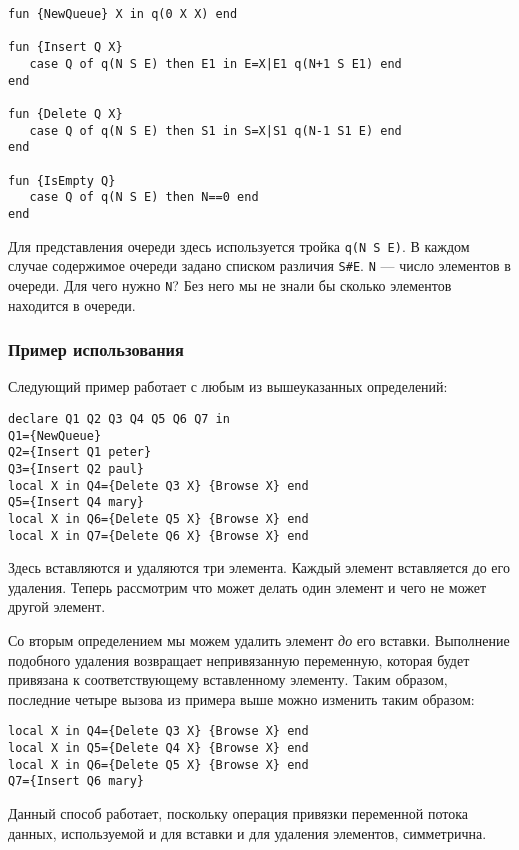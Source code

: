 \begin{lstlisting}
fun {NewQueue} X in q(0 X X) end

fun {Insert Q X}
   case Q of q(N S E) then E1 in E=X|E1 q(N+1 S E1) end
end

fun {Delete Q X}
   case Q of q(N S E) then S1 in S=X|S1 q(N-1 S1 E) end
end

fun {IsEmpty Q}
   case Q of q(N S E) then N==0 end
end
\end{lstlisting}

Для представления очереди здесь используется тройка \lstinline!q(N S E)!. В каждом случае содержимое очереди задано списком различия \lstinline!S#E!. \lstinline!N! --- число элементов в очереди. Для чего нужно \lstinline!N!? Без него мы не знали бы сколько элементов находится в очереди.

\subsubsection{Пример использования}

Следующий пример работает с любым из вышеуказанных определений:

\begin{lstlisting}
declare Q1 Q2 Q3 Q4 Q5 Q6 Q7 in
Q1={NewQueue}
Q2={Insert Q1 peter}
Q3={Insert Q2 paul}
local X in Q4={Delete Q3 X} {Browse X} end
Q5={Insert Q4 mary}
local X in Q6={Delete Q5 X} {Browse X} end
local X in Q7={Delete Q6 X} {Browse X} end
\end{lstlisting}

Здесь вставляются и удаляются три элемента. Каждый элемент вставляется до его удаления. Теперь рассмотрим что может делать один элемент и чего не может другой элемент.

Со вторым определением мы можем удалить элемент \emph{до} его вставки. Выполнение подобного удаления возвращает непривязанную переменную, которая будет привязана к соответствующему вставленному элементу. Таким образом, последние четыре вызова из примера выше можно изменить таким образом:

\begin{lstlisting}
local X in Q4={Delete Q3 X} {Browse X} end
local X in Q5={Delete Q4 X} {Browse X} end
local X in Q6={Delete Q5 X} {Browse X} end
Q7={Insert Q6 mary}
\end{lstlisting}

Данный способ работает, поскольку операция привязки переменной потока данных, используемой и для вставки и для удаления элементов, симметрична.

